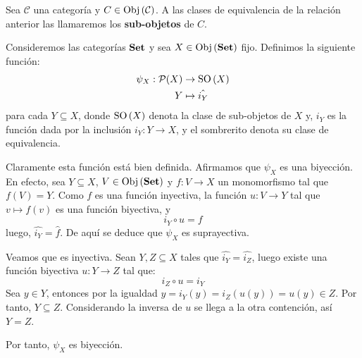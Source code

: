 \documentclass[12pt]{report}
\theoremstyle{largebreak}
\newcommand\cf[3]{\ensuremath{#1:#2\rightarrow#3}}
\newcommand{\Obj}[1]{\ensuremath{\textup{Obj}\left(#1\right)}}
\newcommand{\Cat}[1]{\ensuremath{\textup{\textbf{#1}}}}
\newcommand{\SO}[1]{\ensuremath{\textup{SO}\left(#1\right)}}
\begin{document}
    \begin{mydef}
        Sea $\mathcal{C}$ una categoría y $C\in\Obj{\mathcal{C}}$. A las clases de equivalencia de la relación anterior las llamaremos los \textbf{sub-objetos} de $C$.
    \end{mydef}

    \begin{exa}
        Consideremos las categorías $\Cat{Set}$ y sea $X\in\Obj{\Cat{Set}}$ fijo. Definimos la siguiente función:
        \begin{equation*}
            \begin{split}
                \psi_X:\mathcal{P}(X)&\rightarrow \SO{X}\\
                Y&\mapsto \hat{i_Y}\\
            \end{split}
        \end{equation*}
        para cada $Y\subseteq X$, donde $\SO{X}$ denota la clase de sub-objetos de $X$ y, $i_Y$ es la función dada por la inclusión $\cf{i_Y}{Y}{X}$, y el sombrerito denota su clase de equivalencia.
    \end{exa}

    \begin{sol}
        Claramente esta función está bien definida. Afirmamos que $\psi_X$ es una biyección. En efecto, sea $Y\subseteq X$, $V\in\Obj{\Cat{Set}}$ y $\cf{f}{V}{X}$ un monomorfismo tal que $f(V)=Y$. Como $f$ es una función inyectiva, la función $\cf{u}{V}{Y}$ tal que $v\mapsto f(v)$ es una función biyectiva, y
        \begin{equation*}
            i_Y\circ u=f
        \end{equation*}
        luego, $\hat{i_Y}=\hat{f}$. De aquí se deduce que $\psi_X$ es suprayectiva.

        Veamos que es inyectiva. Sean $Y,Z\subseteq X$ tales que $\hat{i_Y}=\hat{i_Z}$, luego existe una función biyectiva $\cf{u}{Y}{Z}$ tal que:
        \begin{equation*}
            i_Z\circ u = i_Y
        \end{equation*}
        Sea $y\in Y$, entonces por la igualdad $y=i_Y(y)=i_Z(u(y))=u(y)\in Z$. Por tanto, $Y\subseteq Z$. Considerando la inversa de $u$ se llega a la otra contención, así $Y=Z$.

        Por tanto, $\psi_X$ es biyección.
    \end{sol}
\end{document}
